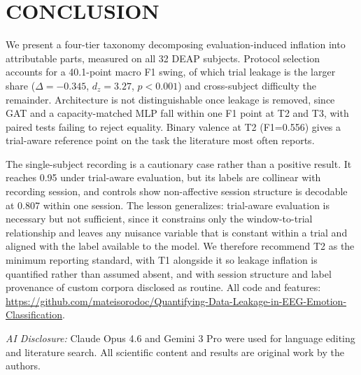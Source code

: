 \documentclass[conference,a4paper]{IEEEtran}
\begin{document}
\section{CONCLUSION}

We present a four-tier taxonomy decomposing evaluation-induced inflation into attributable parts, measured on all 32 DEAP subjects. Protocol selection accounts for a 40.1-point macro F1 swing, of which trial leakage is the larger share ($\Delta=-0.345$, $d_z=3.27$, $p<0.001$) and cross-subject difficulty the remainder. Architecture is not distinguishable once leakage is removed, since GAT and a capacity-matched MLP fall within one F1 point at T2 and T3, with paired tests failing to reject equality. Binary valence at T2 (F1=0.556) gives a trial-aware reference point on the task the literature most often reports.

The single-subject recording is a cautionary case rather than a positive result. It reaches 0.95 under trial-aware evaluation, but its labels are collinear with recording session, and controls show non-affective session structure is decodable at 0.807 within one session. The lesson generalizes: trial-aware evaluation is necessary but not sufficient, since it constrains only the window-to-trial relationship and leaves any nuisance variable that is constant within a trial and aligned with the label available to the model. We therefore recommend T2 as the minimum reporting standard, with T1 alongside it so leakage inflation is quantified rather than assumed absent, and with session structure and label provenance of custom corpora disclosed as routine. All code and features: \url{https://github.com/mateisorodoc/Quantifying-Data-Leakage-in-EEG-Emotion-Classification}.

\smallskip\noindent\textit{AI Disclosure:} Claude Opus 4.6 and Gemini 3 Pro were used for language editing and literature search. All scientific content and results are original work by the authors.
\end{document}
